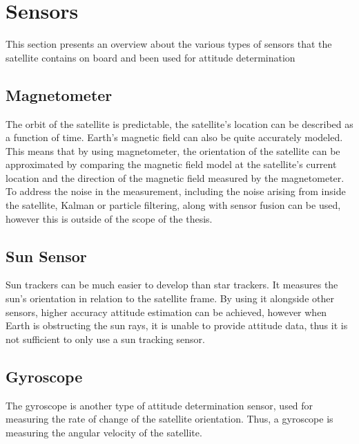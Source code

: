 \section{Sensors}
This section presents an overview about the various types of sensors that the satellite contains on board and been used for attitude determination
\subsection{Magnetometer}

The orbit of the satellite is predictable, the satellite's location can be described as a function of time. Earth's magnetic field can also be quite accurately modeled. This means that by using magnetometer, the orientation of the satellite can be approximated by comparing the magnetic field model at the satellite's current location and the direction of the magnetic field measured by the magnetometer. To address the noise in the measurement, including the noise arising from inside the satellite, Kalman or particle filtering, along with sensor fusion can be used, however this is outside of the scope of the thesis.

\subsection{Sun Sensor}

Sun trackers can be much easier to develop than star trackers. It measures the sun's orientation in relation to the satellite frame. By using it alongside other sensors, higher accuracy attitude estimation can be achieved, however when Earth is obstructing the sun rays, it is unable to provide attitude data, thus it is not sufficient to only use a sun tracking sensor.


\subsection{Gyroscope}


The gyroscope is another type of attitude determination sensor, used for measuring the rate of change of the satellite orientation. Thus, a gyroscope is measuring the angular velocity of the satellite.


